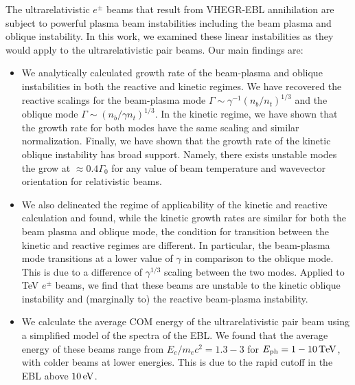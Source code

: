 \documentclass[usenatbib,iop,apj,numberedappendix]{aeb_emulateapj_2015}
\def\eV{{\rm eV}} %
\def\TeV{{\rm T}\eV} %
\newcommand{\epm}{\ensuremath{e^{\pm}}}
\begin{document}
The ultrarelativistic $\epm$ beams that result from VHEGR-EBL annihilation are subject to powerful plasma beam instabilities including the beam plasma and oblique instability.  In this work, we examined these linear instabilities as they would apply to the ultrarelativistic pair beams.  Our main findings are:
\begin{itemize}
\item{We analytically calculated growth rate of the beam-plasma and oblique instabilities in both the reactive and kinetic regimes.  We have recovered the reactive scalings for the beam-plasma mode $\Gamma \sim \gamma^{-1}(n_b/n_t)^{1/3}$ and the oblique mode $\Gamma \sim (n_b/\gamma n_t)^{1/3}$.  In the kinetic regime, we have shown that the growth rate for both modes have the same scaling and similar normalization.  Finally, we have shown that the growth rate of the kinetic oblique instability has broad support. Namely, there exists unstable modes the grow at $\approx 0.4\Gamma_0$ for any value of beam temperature and wavevector orientation for relativistic beams.}
\item{We also delineated the regime of applicability of the kinetic and reactive calculation and found, while the kinetic growth rates are similar for both the beam plasma and oblique mode, the condition for transition between the kinetic and reactive regimes are different.  In particular, the beam-plasma mode transitions at a lower value of $\gamma$ in comparison to the oblique mode.  This is due to a difference of $\gamma^{1/3}$ scaling between the two modes.  Applied to TeV $e^{\pm}$ beams, we find that these beams are unstable to the kinetic oblique instability and (marginally to) the reactive beam-plasma instability.}
\item{We calculate the average COM energy of the ultrarelativistic pair beam using a simplified model of the spectra of the EBL.  We found that the average energy of these beams range from $E_e/m_e c^2 = 1.3-3$ for $E_{\rm ph} = 1-10\,\TeV$, with colder beams at lower energies.  This is due to the rapid cutoff in the EBL above $10\,\eV$. }
\end{itemize}
\end{document}
